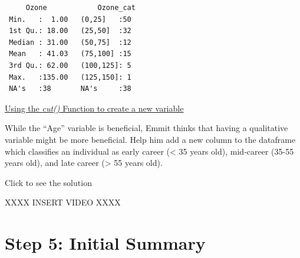 \documentclass[
  letterpaper,
  DIV=11,
  numbers=noendperiod]{scrreprt}
\newenvironment{Shaded}{\begin{snugshade}}{\end{snugshade}}
\newcommand{\AttributeTok}[1]{\textcolor[rgb]{0.40,0.45,0.13}{#1}}
\newcommand{\DecValTok}[1]{\textcolor[rgb]{0.68,0.00,0.00}{#1}}
\newcommand{\FunctionTok}[1]{\textcolor[rgb]{0.28,0.35,0.67}{#1}}
\newcommand{\NormalTok}[1]{\textcolor[rgb]{0.00,0.23,0.31}{#1}}
\newcommand{\OtherTok}[1]{\textcolor[rgb]{0.00,0.23,0.31}{#1}}
\newcommand{\SpecialCharTok}[1]{\textcolor[rgb]{0.37,0.37,0.37}{#1}}
\begin{document}
\begin{Shaded}
\end{Shaded}

\begin{verbatim}
     Ozone            Ozone_cat 
 Min.   :  1.00   (0,25]   :50  
 1st Qu.: 18.00   (25,50]  :32  
 Median : 31.00   (50,75]  :12  
 Mean   : 41.03   (75,100] :15  
 3rd Qu.: 62.00   (100,125]: 5  
 Max.   :135.00   (125,150]: 1  
 NA's   :38       NA's     :38  
\end{verbatim}

\begin{watch}{}{}
    \href{https://youtu.be/3qMzvNiGmd4}{Using the \textit{cut()} Function to create a new variable}
\end{watch}

\begin{tcolorbox}[enhanced jigsaw, colframe=quarto-callout-tip-color-frame, colback=white, breakable, rightrule=.15mm, title=\textcolor{quarto-callout-tip-color}{\faLightbulb}\hspace{0.5em}{Try it Out}, bottomtitle=1mm, toptitle=1mm, titlerule=0mm, left=2mm, coltitle=black, colbacktitle=quarto-callout-tip-color!10!white, leftrule=.75mm, opacitybacktitle=0.6, bottomrule=.15mm, opacityback=0, arc=.35mm, toprule=.15mm]

While the ``Age'' variable is beneficial, Emmit thinks that having a
qualitative variable might be more beneficial. Help him add a new column
to the dataframe which classifies an individual as early career
(\textless{} 35 years old), mid-career (35-55 years old), and late
career (\textgreater{} 55 years old).

Click to see the solution

XXXX INSERT VIDEO XXXX

\end{tcolorbox}

\section{Step 5: Initial Summary}\label{step-5-initial-summary}
\end{document}

